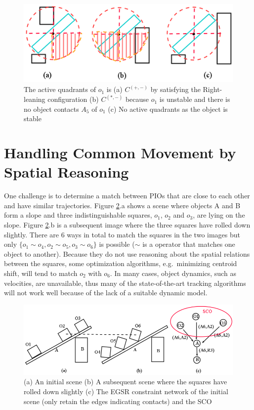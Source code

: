 \documentclass[letterpaper]{article}
\begin{document}
\begin{figure}[t]
\centering\includegraphics[scale=0.35]{ScenarioByRules.png}
\vspace{-3mm}
\caption{ The active quadrants of $o_1$ is (a)  $C^{(+,-)}$ by satisfying the Right-leaning configuration (b) $C^{(*,-)}$ because $o_1$ is unstable and there is no object contacts $A_5$ of $o_1$ (c) No active quadrants as the object is stable}
\label{ScenarioByRules}
\vspace{-6mm}
\end{figure}
\vspace{-2mm}
\section{Handling Common Movement by Spatial Reasoning}
\label{CM}

One challenge is to determine a match between PIOs that are close to each other and have similar trajectories. Figure \ref{SCOExample_2}.a  shows a scene where objects A and B form a slope and three indistinguishable squares, $o_1$, $o_2$ and $o_3$, are lying on the slope. Figure \ref{SCOExample_2}.b is a subsequent image where the three squares have rolled down slightly. There are 6 ways in total to match the squares in the two images but only $\{o_1 \sim o_4, o_2 \sim o_5, o_3 \sim o_6\}$ is possible ($\sim$ is a operator that matches one object to another). Because they do not use reasoning about the spatial relations between the squares, some optimization algorithms, e.g.\ minimizing centroid shift, will tend to match $o_2$ with $o_6$. In many cases, object dynamics, such as velocities, are unavailable, thus many of the state-of-the-art tracking algorithms will not work well because of the lack of a suitable dynamic model. 

\begin{figure}[t]
\centering\includegraphics[scale=0.25]{SpatiallyCorrelatdScenario.png}
\vspace{-2.8mm}\caption{(a) An initial scene (b) A subsequent scene where the squares have rolled down slightly (c) The EGSR constraint network of the initial scene (only retain the edges indicating contacts) and the SCO}
\vspace{-4mm}
\label{SCOExample_2}
\end{figure}
\end{document}
